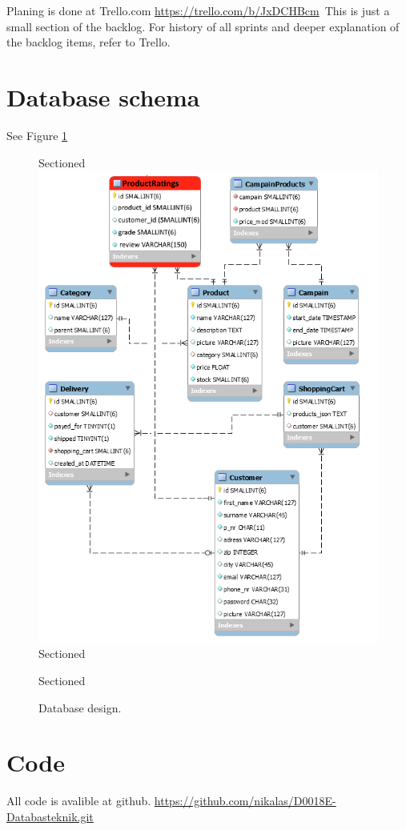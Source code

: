 \documentclass[paper=a4, fontsize=11pt]{report} %
\begin{document}
\begin{itemize}
	Planing is done at Trello.com
	\url{https://trello.com/b/JxDCHBcm}\
	This is just a small section of the backlog. For history of all sprints and deeper
	explanation of the backlog items, refer to Trello.

\section*{Database schema}
See Figure \ref{fig:6}
\begin{figure}
	Sectioned\includegraphics[scale=0.7]{artifacts/db_implemented_1_3.png}
	Sectioned\caption{Database design.}
	Sectioned\label{fig:6}
\end{figure}

\section*{Code}
All code is avalible at github.
\url{https://github.com/nikalas/D0018E-Databasteknik.git}


\end{itemize}
\end{document}
